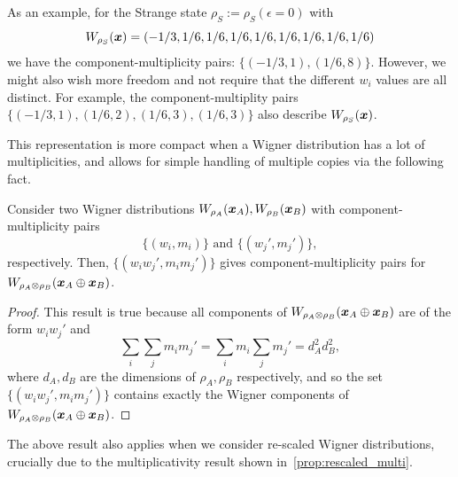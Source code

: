 \documentclass[pra,
aps,
twocolumn,
superscriptaddress,
groupedaddress,
nofootinbib,
reprint
]{revtex4-1}
\begin{document}
As an example, for the Strange state $\rho_S := \rho_S(\epsilon=0)$ with
\begin{equation}
W_{\rho_S}(\boldsymbol{x}) = (-1/3, 1/6,  1/6,  1/6,  1/6,  1/6,  1/6,  1/6,  1/6)
\end{equation}
we have the component-multiplicity pairs: $\{( -1/3, 1), ( 1/6, 8)\}$. However, we might also wish more freedom and not require that the different $w_i$ values are all distinct. For example, the component-multiplity pairs $\{(-1/3, 1), (1/6, 2), (1/6, 3), (1/6, 3)\}$ also describe $W_{\rho_S}(\boldsymbol{x})$.

This representation is more compact when a Wigner distribution has a lot of multiplicities, and allows for simple handling of multiple copies via the following fact.
\begin{lemma}
Consider two Wigner distributions $\W{\rho_A}(\x_A), \W{\rho_B}(\x_B)$ with component-multiplicity pairs 
\begin{equation}
	\{(w_i, m_i)\} \text{ and } \{(w_j', m_j')\},
\end{equation}
respectively. Then, $\{(w_i w_j', m_i m_j')\}$ gives component-multiplicity pairs for $\W{\rho_A \otimes \rho_B}(\x_A \oplus \x_B)$.
\end{lemma}
\begin{proof}
	This result is true because all components of $\W{\rho_A \otimes \rho_B}(\x_A \oplus \x_B)$ are of the form $w_i w_j'$ and 
\begin{equation*}
	\sum_{i}\sum_{j} m_i m_j' = \sum_{i} m_i \sum_{j} m_j' = d_A^2 d_B^2,
\end{equation*}
where $d_A, d_B$ are the dimensions of $\rho_A, \rho_B$ respectively, and
so the set $\{(w_i w_j', m_i m_j')\}$ contains exactly the Wigner components of $\W{\rho_A \otimes \rho_B}(\x_A \oplus \x_B)$.
\end{proof}
The above result also applies when we consider re-scaled Wigner distributions, crucially due to the multiplicativity result shown in~\cref{prop:rescaled_multi}.
\end{document}
